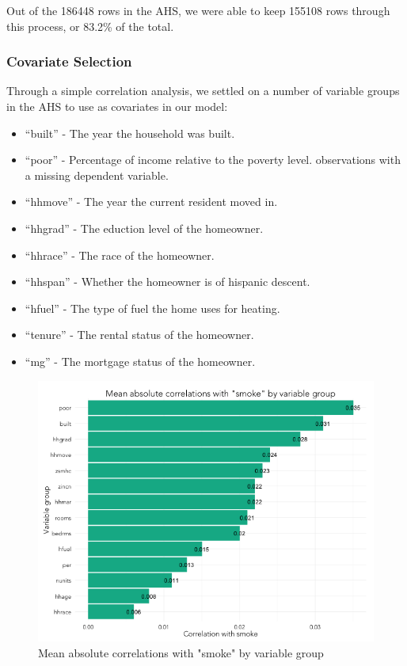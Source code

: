 \documentclass{sig-alternate}
\begin{document}
Out of the 186448 rows in the AHS, we were able to keep 155108 rows through this process, or 83.2\% of the total. 

\subsubsection{Covariate Selection}

Through a simple correlation analysis, we settled on a number of variable groups in the AHS to use as covariates in our model:

\begin{itemize} 
\item ``built'' - The year the household was built. 
\item ``poor'' - Percentage of income relative to the poverty level. observations with a missing dependent variable.
\item ``hhmove'' - The year the current resident moved in.
\item ``hhgrad'' - The eduction level of the homeowner.
\item ``hhrace'' - The race of the homeowner.
\item ``hhspan'' - Whether the homeowner is of hispanic descent.
\item ``hfuel'' - The type of fuel the home uses for heating. 
\item ``tenure'' - The rental status of the homeowner.
\item ``mg'' - The mortgage status of the homeowner.
\end{itemize}

\begin{figure}
\centering 
\includegraphics[scale=0.42]{explore-correlations-1-2.png}
\caption{Mean absolute correlations with "smoke" by variable group}
\end{figure}
\end{document}
